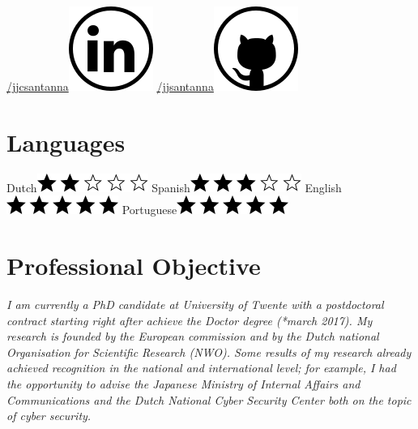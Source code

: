 \documentclass[print]{styles/friggeri-cv-linux} %
\begin{document}
\begin{aside}
\href{https://www.linkedin.com/in/jjcsantanna}{/jjcsantanna}\includegraphics[scale=0.3]{img/linkedin.png}
\href{https://github.com/jjsantanna}{/jjsantanna\includegraphics[scale=0.3]{img/github.png}}
~
\section{Languages}
Dutch\includegraphics[scale=0.40]{img/2stars.png}
Spanish\includegraphics[scale=0.40]{img/3stars.png}
English\includegraphics[scale=0.40]{img/5stars.png}
Portuguese\includegraphics[scale=0.40]{img/5stars.png}
\end{aside}

\section{Professional Objective}\vspace{-10pt}
\setlength\parindent{12pt}\textit{I am currently a PhD candidate at University of
Twente with a postdoctoral contract starting right after achieve the
Doctor degree (*march 2017). My research is founded by the European commission
and by the Dutch national Organisation for Scientific Research (NWO). Some
results of my research already achieved recognition in the national and
international level; for example, I had the opportunity to advise the
Japanese Ministry of Internal Affairs and Communications and the Dutch National
Cyber Security Center both on the topic of cyber security.} 
\end{document}
